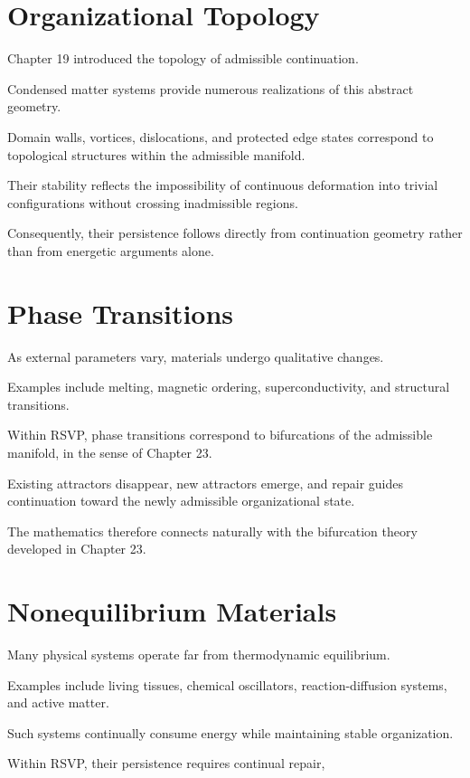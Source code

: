 \documentclass[11pt,oneside]{book}
\numberwithin{equation}{chapter}
\theoremstyle{definition}
\theoremstyle{plain}
\begin{document}
\section{Organizational Topology}

Chapter 19 introduced the topology of admissible continuation.

Condensed matter systems provide numerous realizations of this abstract
geometry.

Domain walls, vortices, dislocations, and protected edge states correspond
to topological structures within the admissible manifold.

Their stability reflects the impossibility of continuous deformation into
trivial configurations without crossing inadmissible regions.

Consequently, their persistence follows directly from continuation geometry
rather than from energetic arguments alone.

\section{Phase Transitions}

As external parameters vary, materials undergo qualitative changes.

Examples include melting, magnetic ordering, superconductivity, and
structural transitions.

Within RSVP, phase transitions correspond to bifurcations of the admissible
manifold, in the sense of Chapter 23.

Existing attractors disappear, new attractors emerge, and repair guides
continuation toward the newly admissible organizational state.

The mathematics therefore connects naturally with the bifurcation theory
developed in Chapter 23.

\section{Nonequilibrium Materials}

Many physical systems operate far from thermodynamic equilibrium.

Examples include living tissues, chemical oscillators, reaction-diffusion
systems, and active matter.

Such systems continually consume energy while maintaining stable
organization.

Within RSVP, their persistence requires continual repair,
\end{document}
